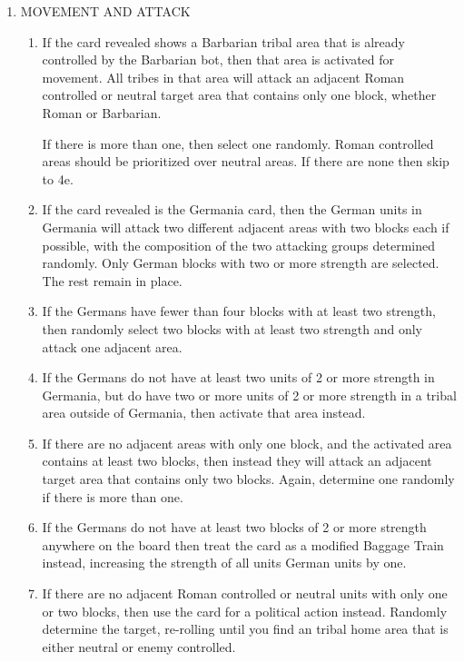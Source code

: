 \begin{enumerate}
  \item MOVEMENT AND ATTACK

  \begin{enumerate}[leftmargin=0in]
    \item \label{solitaire:tribal} If the card revealed shows a Barbarian tribal area that is already controlled by the Barbarian bot, then that area is activated for movement. All tribes in that area will attack an adjacent Roman controlled or neutral target area that contains only one block, whether Roman or Barbarian.
    
    If there is more than one, then select one randomly. Roman controlled areas should be prioritized over neutral areas. If there are none then skip to 4e.

    \item \label{solitaire:germania}If the card revealed is the Germania card, then the German units in Germania will attack two different adjacent areas with two blocks each if possible, with the composition of the two attacking groups determined randomly. Only German blocks with two or more strength are selected. The rest remain in place.

    \item If the Germans have fewer than four blocks with at least two strength, then randomly select two blocks with at least two strength and only attack one adjacent area.
    
    \item If the Germans do not have at least two units of 2 or more strength in Germania, but do have two or more units of 2 or more strength in a tribal area outside of Germania, then activate that area instead.

    \item If there are no adjacent areas with only one block, and the activated area contains at least two blocks, then instead they will attack an adjacent target area that contains only two blocks. Again, determine one randomly if there is more than one.
    
    \item If the Germans do not have at least two blocks of 2 or more strength anywhere on the board then treat the card as a modified Baggage Train instead, increasing the strength of all units German units by one.

    \item If there are no adjacent Roman controlled or neutral units with only one or two blocks, then use the card for a political action instead. Randomly determine the target, re-rolling until you find an tribal home area that is either neutral or enemy controlled.
    

\end{enumerate}
\end{enumerate}
